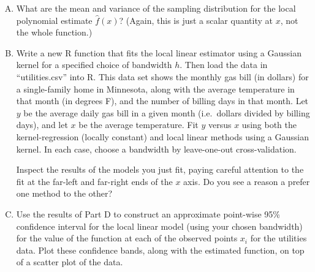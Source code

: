 \documentclass{mynotes}
\begin{document}
\begin{enumerate}[(A)]
\item What are the mean and variance of the sampling distribution for the local polynomial estimate $\hat{f}(x)$?  (Again, this is just a scalar quantity at $x$, not the whole function.)

\item Write a new R function that fits the local linear estimator using a Gaussian kernel for a specified choice of bandwidth $h$. Then load the data in ``utilities.csv'' into R.  This data set shows the monthly gas bill (in dollars) for a single-family home in Minnesota, along with the average temperature in that month (in degrees F), and the number of billing days in that month.  Let $y$ be the average daily gas bill in a given month (i.e.~dollars divided by billing days), and let $x$ be the average temperature.  Fit $y$ versus $x$ using both the kernel-regression (locally constant) and local linear methods using a Gaussian kernel.  In each case, choose a bandwidth by leave-one-out cross-validation.

Inspect the results of the models you just fit, paying careful attention to the fit at the far-left and far-right ends of the $x$ axis.  Do you see a reason a prefer one method to the other?

\item Use the results of Part D to construct an approximate point-wise 95\% confidence interval for the local linear model (using your chosen bandwidth) for the value of the function at each of the observed points $x_i$ for the utilities data.  Plot these confidence bands, along with the estimated function, on top of a scatter plot of the data.

\end{enumerate}
\end{document}
